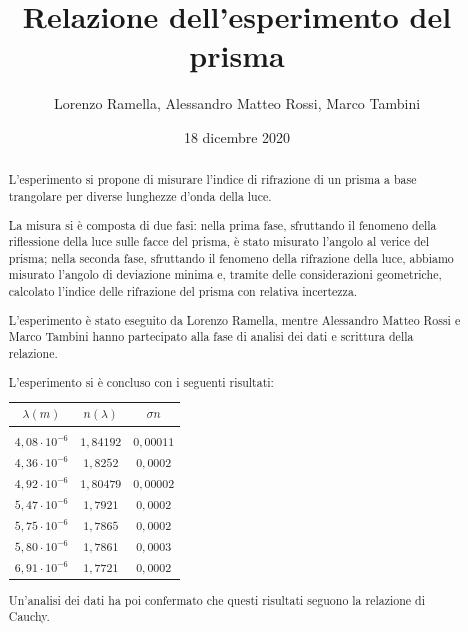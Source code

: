 \documentclass{article}
\title{Relazione dell'esperimento del prisma}
\author{Lorenzo Ramella, Alessandro Matteo Rossi, Marco Tambini}
\date{18 dicembre 2020}
\begin{document}
\maketitle

\begin{abstract}
L’esperimento si propone di misurare l'indice di rifrazione di un prisma a base trangolare per diverse lunghezze d'onda della luce.

La misura si è composta di due fasi: nella prima fase, sfruttando il fenomeno della riflessione della luce sulle facce del prisma, è stato misurato l'angolo al verice del prisma; nella seconda fase, sfruttando il fenomeno della rifrazione della luce, abbiamo misurato l'angolo di deviazione minima e, tramite delle considerazioni geometriche, calcolato l'indice delle rifrazione del prisma con relativa incertezza.

L'esperimento è stato eseguito da Lorenzo Ramella, mentre Alessandro Matteo Rossi e Marco Tambini hanno partecipato alla fase di analisi dei dati e scrittura della relazione.

L'esperimento si è concluso con i seguenti risultati:

\vspace{4mm}

\begin{center}
\begin{tabular}{ ||c | c | c|| }
  \hline
  $\lambda (m)$ & $n (\lambda)$ & $\sigma n$ \\
  \hline \hline && \\ [-0.9ex]
  $4,08 \cdot 10^{-6}$ & $1,84192$ & $0,00011$ \\
  $4,36 \cdot 10^{-6}$ & $1,8252$ & $0,0002$ \\
  $4,92 \cdot 10^{-6}$ & $1,80479$ & $0,00002$ \\
  $5,47 \cdot 10^{-6}$ & $1,7921$ & $0,0002$ \\
  $5,75 \cdot 10^{-6}$ & $1,7865$ & $0,0002$ \\
  $5,80 \cdot 10^{-6}$ & $1,7861$ & $0,0003$ \\
  $6,91 \cdot 10^{-6}$ & $1,7721$ & $0,0002$ \\
  \hline
\end{tabular}
\end{center}

\vspace{4mm}

Un'analisi dei dati ha poi confermato che questi risultati seguono la relazione di Cauchy. 

\end{abstract}
\tableofcontents
\end{document}
